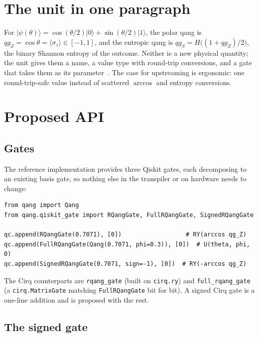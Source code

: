 \documentclass[11pt]{article}
\newcommand{\qgZ}{qg_Z}
\begin{document}
\section{The unit in one paragraph}

For $|\psi(\theta)\rangle=\cos(\theta/2)|0\rangle+\sin(\theta/2)|1\rangle$, the polar qang is
$\qgZ=\cos\theta=\langle\sigma_z\rangle\in[-1,1]$, and the entropic qang is $qg_S=H\big((1+\qgZ)/2\big)$, the
binary Shannon entropy of the outcome. Neither is a new physical quantity; the unit gives them a name, a
value type with round-trip conversions, and a gate that takes them as its parameter~\cite{monteverde2026qang}.
The case for upstreaming is ergonomic: one round-trip-safe value instead of scattered $\arccos$ and
entropy conversions.

\section{Proposed API}

\subsection{Gates}

The reference implementation provides three Qiskit gates, each decomposing to an existing basis gate, so
nothing else in the transpiler or on hardware needs to change:

\begin{lstlisting}
from qang import Qang
from qang.qiskit_gate import RQangGate, FullRQangGate, SignedRQangGate

qc.append(RQangGate(0.7071), [0])                  # RY(arccos qg_Z)
qc.append(FullRQangGate(Qang(0.7071, phi=0.3)), [0])  # U(theta, phi, 0)
qc.append(SignedRQangGate(0.7071, sign=-1), [0])  # RY(-arccos qg_Z)
\end{lstlisting}

The Cirq counterparts are \texttt{rqang\_gate} (built on \texttt{cirq.ry}) and \texttt{full\_rqang\_gate}
(a \texttt{cirq.MatrixGate} matching \texttt{FullRQangGate} bit for bit). A signed Cirq gate is a one-line
addition and is proposed with the rest.

\subsection{The signed gate}\label{sec:signed}
\end{document}
